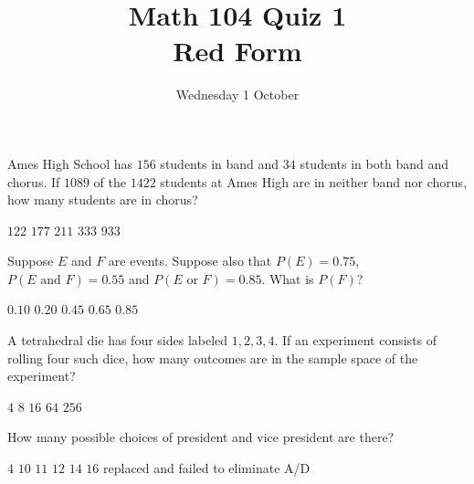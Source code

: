 \documentclass[12pt]{exam}
\title{Math 104 Quiz 1\\Red Form}
\date{Wednesday 1 October}
\begin{document}
\maketitle
\begin{center}
\end{center}

\begin{questions}
\question Ames High School has
$156$ students in band and $34$
students in both band and chorus.
If $1089$ of the $1422$ students at Ames High
are in neither band nor chorus, how many students
are in chorus?\\
\begin{oneparchoices}
\choice $122$ %
\choice $177$ %
\choice $211$ %
\choice $333$ %
\choice $933$ %
\end{oneparchoices}

\question Suppose $E$ and $F$ are events.
Suppose also that $P\left(E\right)=0.75$,
$P\left(\text{$E$ and $F$}\right)=0.55$
and $P\left(\text{$E$ or $F$}\right)=0.85$. What
is $P\left(F\right)$?\\
\begin{oneparchoices}
\choice $0.10$
\choice $0.20$
\choice $0.45$
\choice $0.65$
\choice $0.85$
\end{oneparchoices}

\question A tetrahedral die has four sides labeled $1,2,3,4$.
If an experiment consists of rolling four such dice, how
many outcomes are in the sample space of the experiment?\\
\begin{oneparchoices}
\choice $4$ %
\choice $8$
\choice $16$ %
\choice $64$ %
\choice $256$ %
\end{oneparchoices}


\question\label{FirstPresident}
How many possible choices of president and vice president are there?\\
\begin{oneparchoices}
\choice $4$ %
\choice $10$ %
\choice $11$ %
\choice $12$ %
\choice $14$ %
\choice $16$ replaced and failed to eliminate A/D
\end{oneparchoices}


\end{questions}
\end{document}
